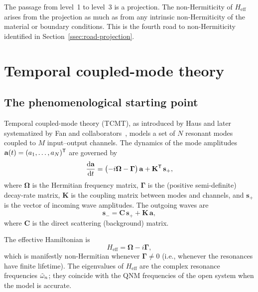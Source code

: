 The passage from level~1 to level~3 is a projection. The non-Hermiticity
of $H_{\mathrm{eff}}$ arises from the projection as much as from any
intrinsic non-Hermiticity of the material or boundary conditions. This
is the fourth road to non-Hermiticity identified in
Section~\ref{ssec:road-projection}.


\section{Temporal coupled-mode theory}
\label{sec:tcmt}

\subsection{The phenomenological starting point}
\label{ssec:tcmt-phenom}

Temporal coupled-mode theory (TCMT), as introduced by Haus and later
systematized by Fan and collaborators~\cite{v2024exact,zhao2019connection}, models a set of $N$ resonant modes
coupled to $M$ input--output channels. The dynamics of the mode amplitudes
$\mathbf{a}(t) = (a_1, \ldots, a_N)^{\mathsf{T}}$ are governed by
\begin{equation}
 \frac{\mathop{}\!\mathrm{d} \mathbf{a}}{\mathop{}\!\mathrm{d} t}
 = \bigl(-i\boldsymbol{\Omega} - \boldsymbol{\Gamma}\bigr)\,\mathbf{a}
 + \mathbf{K}^{\mathsf{T}}\,\mathbf{s}_+,
 \label{eq:tcmt-time}
\end{equation}
where $\boldsymbol{\Omega}$ is the Hermitian frequency matrix,
$\boldsymbol{\Gamma}$ is the (positive semi-definite) decay-rate matrix,
$\mathbf{K}$ is the coupling matrix between modes and channels, and
$\mathbf{s}_+$ is the vector of incoming wave amplitudes. The outgoing
waves are
\begin{equation}
 \mathbf{s}_- = \mathbf{C}\,\mathbf{s}_+
 + \mathbf{K}\,\mathbf{a},
 \label{eq:tcmt-output}
\end{equation}
where $\mathbf{C}$ is the direct scattering (background) matrix.

The effective Hamiltonian is
\begin{equation}
 H_{\mathrm{eff}} = \boldsymbol{\Omega} - i\boldsymbol{\Gamma},
 \label{eq:heff-tcmt}
\end{equation}
which is manifestly non-Hermitian whenever $\boldsymbol{\Gamma} \neq 0$
(i.e., whenever the resonances have finite lifetime). The eigenvalues of
$H_{\mathrm{eff}}$ are the complex resonance frequencies $\tilde{\omega}_n$; they
coincide with the QNM frequencies of the open system when the model is
accurate.

